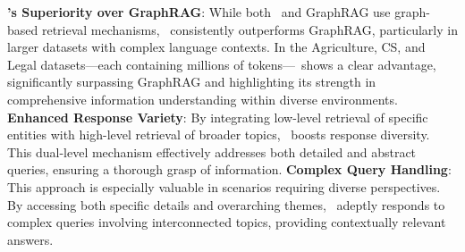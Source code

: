 \textbf{\model's Superiority over GraphRAG}: 
While both \model\ and GraphRAG use graph-based retrieval mechanisms, \model\ consistently outperforms GraphRAG, particularly in larger datasets with complex language contexts. In the Agriculture, CS, and Legal datasets—each containing millions of tokens—\model\ shows a clear advantage, significantly surpassing GraphRAG and highlighting its strength in comprehensive information understanding within diverse environments. \textbf{Enhanced Response Variety}: By integrating low-level retrieval of specific entities with high-level retrieval of broader topics, \model\ boosts response diversity. This dual-level mechanism effectively addresses both detailed and abstract queries, ensuring a thorough grasp of information. \textbf{Complex Query Handling}: This approach is especially valuable in scenarios requiring diverse perspectives. By accessing both specific details and overarching themes, \model\ adeptly responds to complex queries involving interconnected topics, providing contextually relevant answers.

